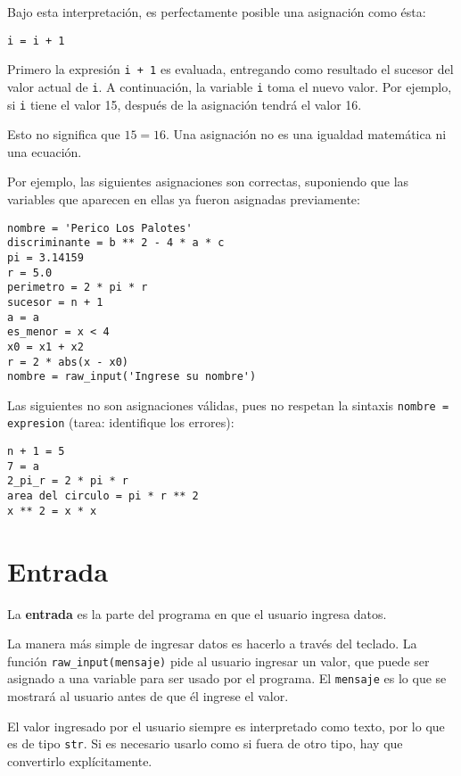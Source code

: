 Bajo esta interpretación, es perfectamente posible una asignación como
ésta:

\begin{lstlisting}
i = i + 1
\end{lstlisting}

Primero la expresión \lstinline!i + 1! es evaluada, entregando como
resultado el sucesor del valor actual de \lstinline!i!. A continuación,
la variable \lstinline!i! toma el nuevo valor. Por ejemplo, si
\lstinline!i! tiene el valor 15, después de la asignación tendrá el
valor 16.

Esto no significa que \(15 = 16\). Una asignación no es una igualdad
matemática ni una ecuación.

Por ejemplo, las siguientes asignaciones son correctas, suponiendo que
las variables que aparecen en ellas ya fueron asignadas previamente:

\begin{lstlisting}
nombre = 'Perico Los Palotes'
discriminante = b ** 2 - 4 * a * c
pi = 3.14159
r = 5.0
perimetro = 2 * pi * r
sucesor = n + 1
a = a
es_menor = x < 4
x0 = x1 + x2
r = 2 * abs(x - x0)
nombre = raw_input('Ingrese su nombre')
\end{lstlisting}

Las siguientes no son asignaciones válidas, pues no respetan la sintaxis
\lstinline!nombre = expresion! (tarea: identifique los errores):

\begin{lstlisting}
n + 1 = 5
7 = a
2_pi_r = 2 * pi * r
area del circulo = pi * r ** 2
x ** 2 = x * x
\end{lstlisting}

\section{Entrada}

La \textbf{entrada} es la parte del programa en que el usuario ingresa
datos.

La manera más simple de ingresar datos es hacerlo a través del teclado.
La función \lstinline!raw_input(mensaje)! pide al usuario ingresar un
valor, que puede ser asignado a una variable para ser usado por el
programa. El \lstinline!mensaje! es lo que se mostrará al usuario antes
de que él ingrese el valor.

El valor ingresado por el usuario siempre es interpretado como texto,
por lo que es de tipo \lstinline!str!. Si es necesario usarlo como si
fuera de otro tipo, hay que convertirlo explícitamente.

